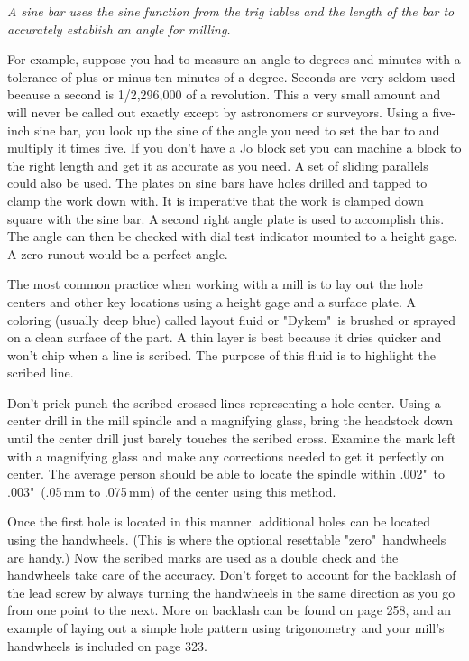 \bigskip
\textit{A sine bar uses the sine function from the trig tables and the length of
the bar to accurately establish an angle for milling.}
\bigskip

For example, suppose you had to measure an angle to degrees and minutes with a
tolerance of plus or minus ten minutes of a degree. Seconds are very seldom used
because a second is 1/2,296,000 of a revolution. This a very small amount and
will never be called out exactly except by astronomers or surveyors. Using a
five-inch sine bar, you look up the sine of the angle you need to set the bar to
and multiply it times five. If you don't have a Jo block set you can machine a
block to the right length and get it as accurate as you need. A set of sliding
parallels could also be used. The plates on sine bars have holes drilled and
tapped to clamp the work down with. It is imperative that the work is clamped
down square with the sine bar. A second right angle plate is used to accomplish
this. The angle can then be checked with dial test indicator mounted to a height
gage. A zero runout would be a perfect angle.


The most common practice when working with a mill is to lay out the hole centers
and other key locations using a height gage and a surface plate. A coloring
(usually deep blue) called layout fluid or "Dykem"\ is brushed or sprayed on a
clean surface of the part. A thin layer is best because it dries quicker and
won't chip when a line is scribed. The purpose of this fluid is to highlight the
scribed line.

Don't prick punch the scribed crossed lines representing a hole center. Using a
center drill in the mill spindle and a magnifying glass, bring the headstock
down until the center drill just barely touches the scribed cross. Examine the
mark left with a magnifying glass and make any corrections needed to get it
perfectly on center. The average person should be able to locate the spindle
within .002"\ to .003"\ (.05\,mm to .075\,mm) of the center using this method.

Once the first hole is located in this manner. additional holes can be located
using the handwheels. (This is where the optional resettable "zero"\ handwheels
are handy.) Now the scribed marks are used as a double check and the handwheels
take care of the accuracy. Don't forget to account for the backlash of the lead
screw by always turning the handwheels in the same direction as you go from one
point to the next. More on backlash can be found on page 258, and an example of
laying out a simple hole pattern using trigonometry and your mill's handwheels
is included on page 323.

